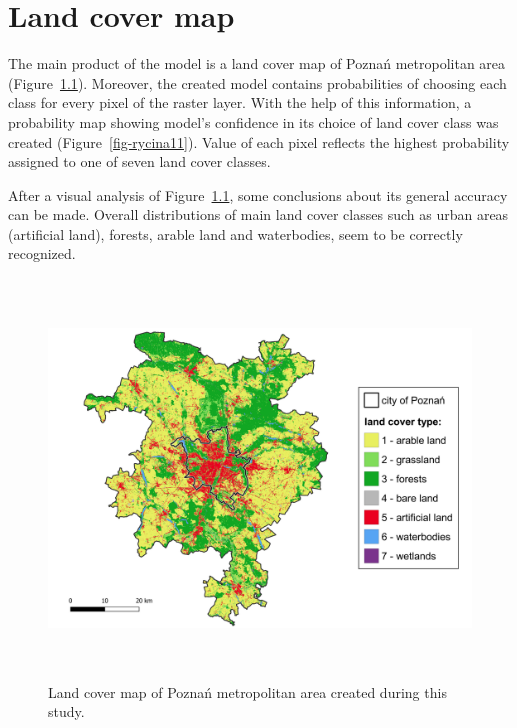 \documentclass{amuthesis}
\begin{document}

\hypertarget{sec-results-map}{%
\chapter{Land cover map}\label{sec-results-map}}

The main product of the model is a land cover map of Poznań metropolitan
area (Figure~\ref{fig-rycina9}). Moreover, the created model contains
probabilities of choosing each class for every pixel of the raster
layer. With the help of this information, a probability map showing
model's confidence in its choice of land cover class was created
(Figure~\ref{fig-rycina11}). Value of each pixel reflects the highest
probability assigned to one of seven land cover classes.

After a visual analysis of Figure~\ref{fig-rycina9}, some conclusions
about its general accuracy can be made. Overall distributions of main
land cover classes such as urban areas (artificial land), forests,
arable land and waterbodies, seem to be correctly recognized.

\begin{figure}[H]

{\centering \includegraphics[width=5.875in,height=4.16667in]{./figures/result_map-lc.png}

}

\caption{\label{fig-rycina9}Land cover map of Poznań metropolitan area
created during this study.}

\end{figure}
\end{document}
